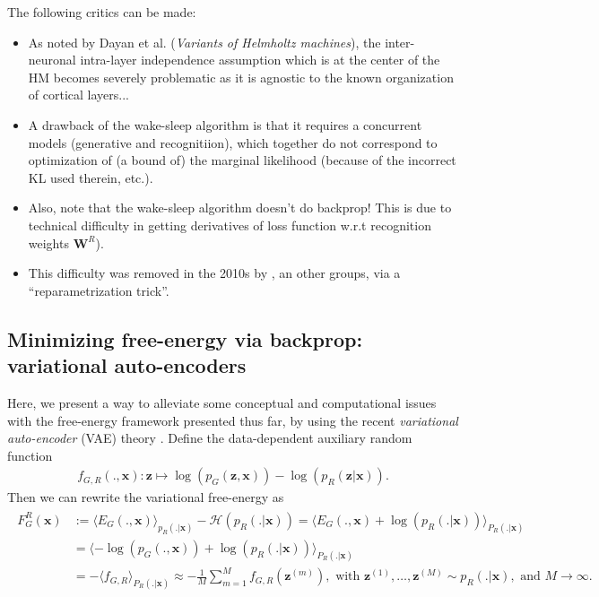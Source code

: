 \documentclass[10pt,letterpaper]{article}
\def\z{\mathbf{z}}
\def\W{\mathbf{W}}
\def\x{\mathbf{x}}
\begin{document}
The following critics can be made:
\begin{itemize}
  \item
    As noted by Dayan et al. (\textit{Variants of Helmholtz machines}), the inter-neuronal intra-layer independence assumption which is at the center of the HM becomes severely problematic as it is agnostic to the known organization of cortical layers...
  \item A drawback of the wake-sleep algorithm is that it requires a concurrent models (generative and recognitiion), which together do not correspond to optimization of (a bound of) the marginal likelihood (because of the incorrect KL used therein, etc.).
  \item Also, note that the wake-sleep algorithm doesn't do backprop! This is due to
    technical difficulty in getting derivatives of loss function w.r.t
    recognition weights $\W^R$).
  \item This difficulty was removed in the 2010s by \citep{kingma2013auto}, an other groups, via a ``reparametrization trick''.
    \end{itemize}


\subsection{Minimizing free-energy via backprop: variational auto-encoders}

\label{sec:vae}
Here, we present a way to alleviate some conceptual and computational issues with the
free-energy framework presented thus far, by using the recent \textit{variational auto-encoder} (VAE) theory \citep{kingma2013auto}. Define the data-dependent
auxiliary random function
\begin{eqnarray}
  f_{G,R}(., \x) :\z \mapsto \log(p_G(\z,\x)) - \log(p_R(\z|\x)).
\end{eqnarray}
Then we can rewrite the
variational free-energy as
\begin{eqnarray*}
  \begin{split}
    F_G^R(\x) &:= \langle E_G(., \x) \rangle_{p_R(. |\x)} - \mathcal H(p_R(. |\x)) = \langle E_G(., \x) + \log(p_R(.|\x))\rangle_{P_R(.|\x)}\\
    &=\langle -\log(p_G(.,\x)) + \log(p_R(.|\x))\rangle_{P_R(.|\x)}\\
    &= -\langle f_{G,R}\rangle_{P_R(.|\x)} \approx -\frac{1}{M}\sum_{m=1}^Mf_{G,R}(\z^{(m)}), \text{ with }\z^{(1)},\ldots,\z^{(M)} \sim p_R(.|\x), \text{ and }M \rightarrow \infty.
    \end{split}
\end{eqnarray*}
\end{document}
